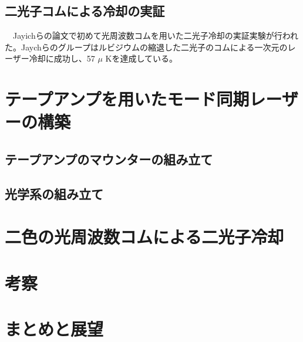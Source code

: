 \documentclass[uplatex,dvipdfmx,a4paper,report,papersize,11pt]{jsbook}
\begin{document}
\section{二光子コムによる冷却の実証}
　Jayichらの論文\cite{PhysRevX.6.041004}で初めて光周波数コムを用いた二光子冷却の実証実験が行われた。Jaychらのグループはルビジウムの縮退した二光子のコムによる一次元のレーザー冷却に成功し、57 $\mu$ Kを達成している。



\chapter{テープアンプを用いたモード同期レーザーの構築}
\section{テープアンプのマウンターの組み立て}
\section{光学系の組み立て}

\newpage
\chapter{二色の光周波数コムによる二光子冷却}

\chapter{考察}
\chapter{まとめと展望}







\end{document}
